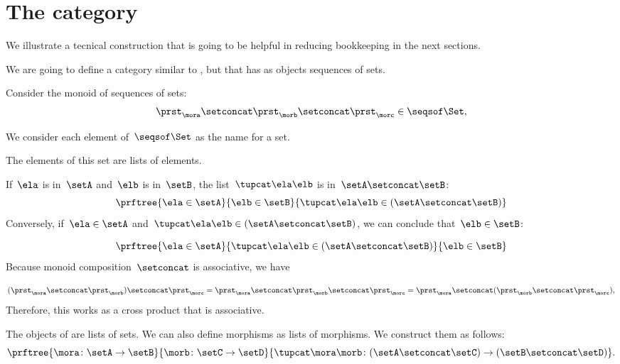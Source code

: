 \section{The \SetStar category}
\label{sec:SetStar}

We illustrate a tecnical construction that is going to be helpful in reducing bookkeeping in the next sections.

We are going to define a category similar to \Set, but that has as objects sequences of sets.

Consider the monoid of sequences of sets:
%
\begin{equation}
    \label{eq:sets-monoid}
    \prst_{\mora} \setconcat \prst_{\morb} \setconcat \prst_{\morc} \in \seqsof\Set,
\end{equation}
%

We consider each element of~$\seqsof\Set$ as the name for a set.

The elements of this set are lists of elements.

If~$\ela$ is in~$\setA$ and~$\elb$ is in~$\setB$, the list~$\tupcat \ela \elb$ is in~$\setA \setconcat \setB$:
%
\begin{equation}
    \label{eq:sets-monoid-axiom1}
    \prftree{\ela \in \setA}{\elb \in \setB}{ \tupcat \ela \elb \in (\setA \setconcat \setB) }
\end{equation}
%
Conversely, if~$\ela \in \setA$ and~$\tupcat \ela \elb \in (\setA \setconcat \setB)$, we can conclude that~$\elb \in \setB$:
%

\begin{equation}
    \label{eq:sets-monoid-axiom2}
    \prftree{\ela \in \setA}{ \tupcat \ela \elb \in (\setA \setconcat \setB) }{  \elb \in  \setB }
\end{equation}
Because monoid composition~$\setconcat$ is associative, we have
%

\begin{equation}
    \label{eq:sets-monoid-comp}
    (\prst_{\mora} \setconcat \prst_{\morb} )\setconcat \prst_{\morc} =
    \prst_{\mora} \setconcat \prst_{\morb} \setconcat \prst_{\morc} =
    \prst_{\mora} \setconcat (\prst_{\morb} \setconcat \prst_{\morc}),
\end{equation}
%
Therefore, this works as a cross product that is associative.

The objects of \SetStar are lists of sets.
We can also define morphisms as lists of morphisms.
We construct them as follows:
%
\begin{equation}
    \label{eq:sets-monoid-maps2}
    \prftree{ \mora \colon \setA \to \setB}{ \morb \colon \setC \to \setD}{ \tupcat \mora \morb \colon (\setA \setconcat \setC)\to (\setB \setconcat \setD)}.
\end{equation}
%

